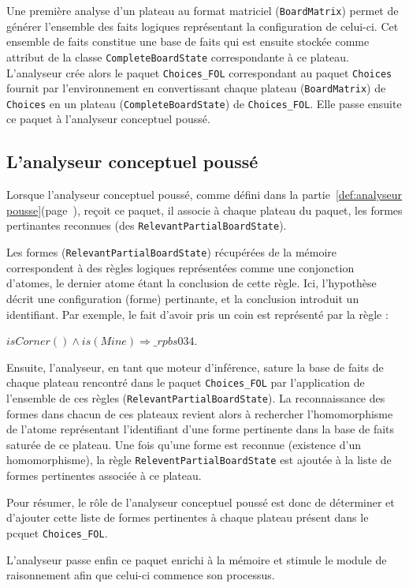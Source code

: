 Une première analyse d'un plateau au format matriciel (\texttt{BoardMatrix}) permet de générer l'ensemble des faits logiques représentant la configuration de celui-ci. Cet ensemble de faits constitue une base de faits qui est ensuite stockée comme attribut de la classe \texttt{CompleteBoardState} correspondante à ce plateau. L'analyseur crée alors le paquet \texttt{Choices\_FOL} correspondant au paquet \texttt{Choices} fournit par l'environnement en convertissant chaque plateau (\texttt{BoardMatrix}) de \texttt{Choices} en un plateau (\texttt{CompleteBoardState}) de \texttt{Choices\_FOL}. Elle passe ensuite ce paquet à l'analyseur conceptuel poussé. 
\subsection{L'analyseur conceptuel poussé}
Lorsque l'analyseur conceptuel poussé, comme défini dans la partie~\ref{def:analyseur pousse}(page~\pageref{def:analyseur pousse}), reçoit ce paquet, il associe à chaque plateau du paquet, les formes pertinantes reconnues (des \texttt{RelevantPartialBoardState}).

Les formes (\texttt{RelevantPartialBoardState}) récupérées de la mémoire correspondent à des règles logiques représentées comme une conjonction d'atomes, le dernier atome étant la conclusion de cette règle. Ici, l'hypothèse décrit une configuration (forme) pertinante, et la conclusion introduit un identifiant. Par exemple, le fait d'avoir pris un coin est représenté par la règle :

\textit{$isCorner() \wedge is(Mine) \Longrightarrow \_rpbs034$}. 

Ensuite, l'analyseur, en tant que moteur d'inférence, sature la base de faits de chaque plateau rencontré dans le paquet \texttt{Choices\_FOL} par l'application de l'ensemble de ces règles (\texttt{RelevantPartialBoardState}). La reconnaissance des formes dans chacun de ces plateaux revient alors à rechercher l'homomorphisme de l'atome représentant l'identifiant d'une forme pertinente dans la base de faits saturée de ce plateau. Une fois qu'une forme est reconnue (existence d'un homomorphisme), la règle \texttt{ReleventPartialBoardState} est ajoutée à la liste de formes pertinentes associée à ce plateau.

Pour résumer, le rôle de l'analyseur conceptuel poussé est donc de déterminer et d'ajouter cette liste de formes pertinentes à chaque plateau présent dans le pcquet \texttt{Choices\_FOL}. 

L'analyseur passe enfin ce paquet enrichi à la mémoire et stimule le module de raisonnement afin que celui-ci commence son processus. 